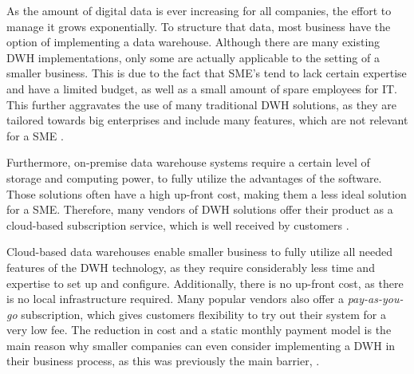 \documentclass[../paper.tex]{subfiles}
\begin{document}
As the amount of digital data is ever increasing for all companies, the effort to manage it grows exponentially. To structure that data, most business have the option of implementing a data warehouse. Although there are many existing DWH implementations, only some are actually applicable to the setting of a smaller business. This is due to the fact that SME's tend to lack certain expertise and have a limited budget, as well as a small amount of spare employees for IT. This further aggravates the use of many traditional DWH solutions, as they are tailored towards big enterprises and include many features, which are not relevant for a SME \cite{Raj2016}.

Furthermore, on-premise data warehouse systems require a certain level of storage and computing power, to fully utilize the advantages of the software. Those solutions often have a high up-front cost, making them a less ideal solution for a SME. Therefore, many vendors of DWH solutions offer their product as a cloud-based subscription service, which is well received by customers \cite{Agostino2013}.

Cloud-based data warehouses enable smaller business to fully utilize all needed features of the DWH technology, as they require considerably less time and expertise to set up and configure. Additionally, there is no up-front cost, as there is no local infrastructure required. Many popular vendors also offer a \textit{pay-as-you-go} subscription, which gives customers flexibility to try out their system for a very low fee. The reduction in cost and a static monthly payment model is the main reason why smaller companies can even consider implementing a DWH in their business process, as this was previously the main barrier, \cite{Fernandes2016}.
\end{document}

